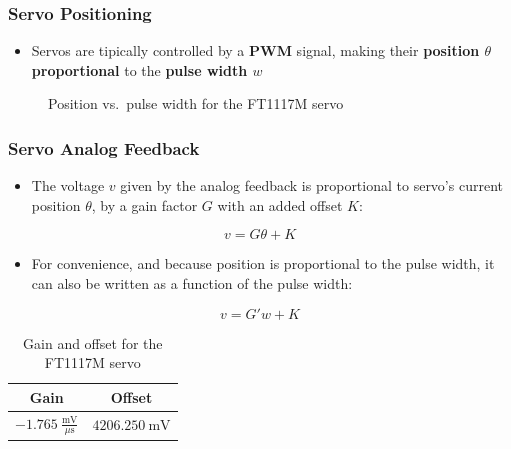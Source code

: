 \documentclass[handout]{beamer}
\begin{document}
\begin{frame}
  \frametitle{Servo Positioning}

  \begin{itemize}
    \item<-1> Servos are tipically controlled by a \textbf{PWM} signal, making
          their \textbf{position $\theta$ proportional} to the
          \textbf{pulse width $w$}
  \end{itemize}

  \begin{figure}
    \centering
    \caption{Position vs.\ pulse width for the FT1117M servo}
  \end{figure}
\end{frame}

\begin{frame}
  \frametitle{Servo Analog Feedback}

  \begin{itemize}
    \item<-1> The voltage $v$ given by the analog feedback is proportional to
          servo's current position $\theta$, by a gain factor $G$ with an added
          offset $K$:
  \end{itemize}
  \[
    v = G\theta + K
  \]
  \begin{itemize}
    \item<-2> For convenience, and because position is proportional to the pulse
          width, it can also be written as a function of the
          pulse width:
  \end{itemize}
  \[
    v = G'w + K
  \]

  \begin{table}
    \centering
    \begin{tabular}{cc}
      \toprule
      Gain                                       & Offset                 \\
      \midrule
      $-1.765~\frac{\textrm{mV}}{\mu\textrm{s}}$ & $4206.250~\textrm{mV}$ \\
      \bottomrule
    \end{tabular}
    \caption{Gain and offset for the FT1117M servo}
  \end{table}
\end{frame}
\end{document}
